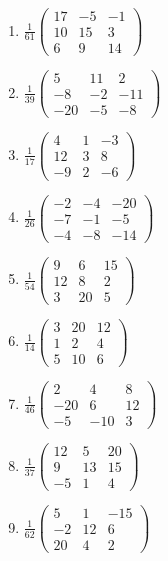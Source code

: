 \begin{enumerate}[label=\arabic*., leftmargin=*, itemsep=1pt]
\item $\frac{1}{61}\left(\begin{smallmatrix}17 & -5 & -1\\ 10 & 15 & 3\\ 6 & 9 & 14\end{smallmatrix}\right)$
\item $\frac{1}{39}\left(\begin{smallmatrix}5 & 11 & 2\\ -8 & -2 & -11\\ -20 & -5 & -8\end{smallmatrix}\right)$
\item $\frac{1}{17}\left(\begin{smallmatrix}4 & 1 & -3\\ 12 & 3 & 8\\ -9 & 2 & -6\end{smallmatrix}\right)$
\item $\frac{1}{26}\left(\begin{smallmatrix}-2 & -4 & -20\\ -7 & -1 & -5\\ -4 & -8 & -14\end{smallmatrix}\right)$
\item $\frac{1}{54}\left(\begin{smallmatrix}9 & 6 & 15\\ 12 & 8 & 2\\ 3 & 20 & 5\end{smallmatrix}\right)$
\item $\frac{1}{14}\left(\begin{smallmatrix}3 & 20 & 12\\ 1 & 2 & 4\\ 5 & 10 & 6\end{smallmatrix}\right)$
\item $\frac{1}{46}\left(\begin{smallmatrix}2 & 4 & 8\\ -20 & 6 & 12\\ -5 & -10 & 3\end{smallmatrix}\right)$
\item $\frac{1}{37}\left(\begin{smallmatrix}12 & 5 & 20\\ 9 & 13 & 15\\ -5 & 1 & 4\end{smallmatrix}\right)$
\item $\frac{1}{62}\left(\begin{smallmatrix}5 & 1 & -15\\ -2 & 12 & 6\\ 20 & 4 & 2\end{smallmatrix}\right)$

\end{enumerate}
